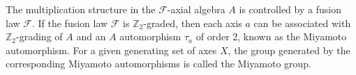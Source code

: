 \documentclass[12pt]{article}
\newcommand\cF{\mathcal{F}}
\begin{document}
	The multiplication structure in the $\cF$-axial algebra $A$ is controlled by a fusion law $\cF$. If the fusion law $\cF$ is $\mathbb{Z}_2$-graded, then each axis $a$ can be associated with $\mathbb{Z}_2$-grading of $A$ and an $A$ automorphism $\tau_a$ of order $2$, known as the Miyamoto automorphism. For a given generating set of axes $X$, the group generated by the corresponding Miyamoto automorphisms is called the Miyamoto group.
	
		
	
		
	
\end{document}
